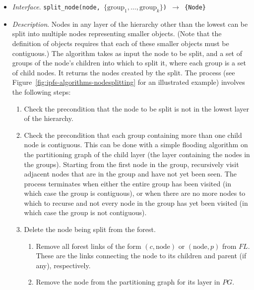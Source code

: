 \begin{itemize}

\item \emph{Interface}. \texttt{split_node(node, $\{\mbox{group}_1,\ldots,\mbox{group}_k\}$) $\rightarrow$ \{Node\}}

\item \emph{Description}. Nodes in any layer of the hierarchy other than the lowest can be split into multiple nodes representing smaller objects. (Note that the definition of objects requires that each of these smaller objects must be contiguous.) The algorithm takes as input the node to be split, and a set of groups of the node's children into which to split it, where each group is a set of child nodes. It returns the nodes created by the split. The process (see Figure~\ref{fig:ipfs-algorithms-nodesplitting} for an illustrated example) involves the following steps:

\begin{enumerate}

\item Check the precondition that the node to be split is not in the lowest layer of the hierarchy.

\item Check the precondition that each group containing more than one child node is contiguous. This can be done with a simple flooding algorithm on the partitioning graph of the child layer (the layer containing the nodes in the groups). Starting from the first node in the group, recursively visit adjacent nodes that are in the group and have not yet been seen. The process terminates when either the entire group has been visited (in which case the group is contiguous), or when there are no more nodes to which to recurse and not every node in the group has yet been visited (in which case the group is not contiguous).

\item Delete the node being split from the forest.

\begin{enumerate}

\item Remove all forest links of the form $(c,\mbox{node})$ or $(\mbox{node},p)$ from $\textit{FL}$. These are the links connecting the node to its children and parent (if any), respectively.

\item Remove the node from the partitioning graph for its layer in $\textit{PG}$.


\end{enumerate}
\end{enumerate}
\end{itemize}
